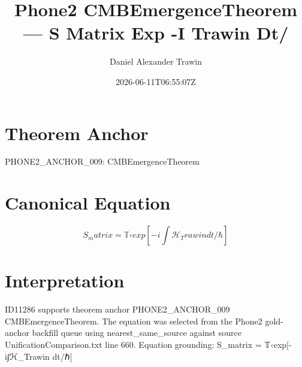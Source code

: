 \documentclass[11pt]{article}
\title{Phone2 CMBEmergenceTheorem — S Matrix Exp -I Trawin Dt/}
\author{Daniel Alexander Trawin}
\date{2026-06-11T06:55:07Z}
\begin{document}
\maketitle
\section*{Theorem Anchor}
PHONE2_ANCHOR_009: CMBEmergenceTheorem
\section*{Canonical Equation}
\[
S_matrix = 𝕋‹exp[-i∫ℋ_Trawin dt/ℏ]
\]
\section*{Interpretation}
ID11286 supports theorem anchor PHONE2_ANCHOR_009 CMBEmergenceTheorem. The equation was selected from the Phone2 gold-anchor backfill queue using nearest_same_source against source UnificationComparison.txt line 660. Equation grounding: S_matrix = 𝕋‹exp[-i∫ℋ_Trawin dt/ℏ]
\end{document}
